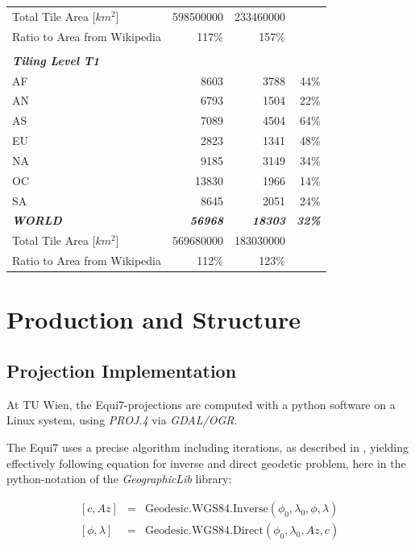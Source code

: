 \documentclass[10pt,a4paper]{article}
\begin{document}
\begin{table}[htbp]
\begin{tabular}{lrrr}
    \hline
    Total Tile Area [$km^{2}$] & 598500000 & 233460000 &  \\
    Ratio to Area from Wikipedia & 117\% & 157\% &  \\
    \hline
    \\   
    \textit{\textbf{Tiling Level T1}} \\
    AF    & 8603  & 3788  & 44\% \\
    AN    & 6793  & 1504  & 22\% \\
    AS    & 7089  & 4504  & 64\% \\
    EU    & 2823  & 1341  & 48\% \\
    NA    & 9185  & 3149  & 34\% \\
    OC    & 13830 & 1966  & 14\% \\
    SA    & 8645  & 2051  & 24\% \\
    \hline
    \textit{\textbf{WORLD}} & \textit{\textbf{56968}} & \textit{\textbf{18303}} & \textit{\textbf{32\%}} \\
    \hline
    Total Tile Area [$km^{2}$] & 569680000 & 183030000 &  \\
    Ratio to Area from Wikipedia & 112\% & 123\% &  \\
	\hline
    \end{tabular}%
  \label{tab:tilestatistics}%
\end{table}%

\newpage

\section{Production and Structure}
\label{sec:production}

\subsection{Projection Implementation}
\label{sub:proj_impl}

At TU Wien, the Equi7-projections are computed with a python software on a Linux system, using \textit{PROJ.4} via \textit{GDAL/OGR}.

The Equi7 uses a precise algorithm including iterations, as described in \cite{Karney2013}, yielding effectively following equation for inverse and direct geodetic problem, here in the python-notation of the \textit{GeographicLib} library:

\begin{eqnarray}
\left[ c, \mathit{Az} \right] &=& \mathrm{Geodesic.WGS84.Inverse}(\phi_{0}, \lambda_{0}, \phi, \lambda) \\
\left[ \phi , \lambda \right] &=& \mathrm{Geodesic.WGS84.Direct}(\phi_{0}, \lambda_{0}, \mathit{Az}, c)
\end{eqnarray}
\end{document}
